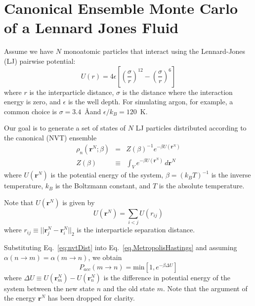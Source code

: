 \documentclass[aip,jcp,preprint,superscriptaddress,floatfix]{revtex4-1}
\begin{document}
\section{Canonical Ensemble Monte Carlo of a Lennard Jones Fluid}

Assume we have $N$ monoatomic particles that interact using the Lennard-Jones (LJ) pairwise potential:
\begin{equation}
U(r) = 4 \epsilon \left[\left(\frac{\sigma}{r}\right)^{12} -\left(\frac{\sigma}{r}\right)^{6} \right] 
\end{equation}
where $r$ is the interparticle distance, $\sigma$ is the distance where the interaction energy is zero, and $\epsilon$ is the well depth. 
For simulating argon, for example, a common choice is $\sigma = 3.4$~\AA and $\epsilon/k_B = 120$~K.

Our goal is to generate a set of states of $N$ LJ particles distributed according to the canonical (NVT) ensemble
\begin{eqnarray}
	\rho_n \left(\textbf{r}^N ; \beta \right) &=& Z(\beta)^{-1} e^{-\beta U \left( \textbf{r}^N \right)} \label{eq:nvtDist} \\
	Z(\beta) &\equiv& \int_V e^{-\beta U \left(  \textbf{r}^N \right)} \, d\textbf{r}^N 
\end{eqnarray}
where $U \left( \textbf{r}^N \right)$ is the potential energy of the system, $\beta = (k_B T)^{-1}$ is the inverse temperature, $k_B$ is the Boltzmann constant, and $T$ is the absolute temperature. 

Note that  $U \left( \textbf{r}^N \right)$ is given by
\begin{equation}
	U \left( \textbf{r}^N \right) = \sum_{i < j} U \left( r_{ij} \right) 
	\label{eq.LennardJonesTotalPotential}
\end{equation}
where $r_{ij} \equiv || \textbf{r}^N_j - \textbf{r}^N_i ||_2$ is the interparticle separation distance.

Substituting Eq.~\ref{eq:nvtDist} into Eq.~\ref{eq.MetropolisHastings} and assuming $\alpha \left( n \rightarrow m \right) =  \alpha \left( m \rightarrow n \right)$, we obtain
\begin{equation}
	P_{acc}(m \rightarrow n) = \text{min} \left[
		1,e^{-\beta \Delta U}
	\right]
	\label{eq.detailedBalanceNVT}
\end{equation}
where $\Delta U \equiv U(\textbf{r}^N_m) - U(\textbf{r}^N_n)$ is the difference in potential energy of the system
between the new state $n$ and the old state $m$. Note that the argument
of the energy $\textbf{r}^N$ has been dropped for clarity.
\end{document}
